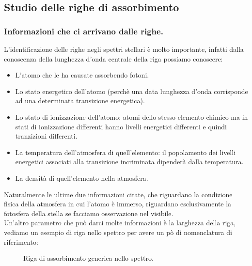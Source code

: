 \subsection{Studio delle righe di assorbimento}
\label{subsec:Studio delle righe di assorbimento}
\subsubsection{Informazioni che ci arrivano dalle righe.}
\label{subsubsec:Informazioni che ci arrivano dalle righe.}
L'identificazione delle righe negli spettri stellari è molto importante, infatti dalla conoscenza della lunghezza d'onda centrale della riga possiamo conoscere:
\begin{itemize}
	\item L'atomo che le ha causate assorbendo fotoni.
	\item Lo stato energetico dell'atomo (perchè una data lunghezza d'onda corrisponde ad una determinata transizione energetica).
	\item Lo stato di ionizzazione dell'atomo: atomi dello stesso elemento chimico ma in stati di ionizzazione differenti hanno livelli energetici differenti e quindi tranzizioni differenti.
	\item La temperatura dell'atmosfera di quell'elemento: il popolamento dei livelli energetici associati alla transizione incriminata dipenderà dalla temperatura.
	\item La densità di quell'elemento nella atmosfera.
\end{itemize}
Naturalmente le ultime due informazioni citate, che riguardano la condizione fisica della atmosfera in cui l'atomo è immerso, riguardano esclusivamente la fotosfera della stella se facciamo osservazione nel visibile.\\
Un'altro parametro che può darci molte informazioni è la larghezza della riga, vediamo un esempio di riga nello spettro per avere un pò di nomenclatura di riferimento:
\begin{figure}[H]
    \centering
    \caption{Riga di assorbimento generica nello spettro.}
    \label{fig:riga-di-assorbimento-generica-nello-spettro}
\end{figure}
\noindent
